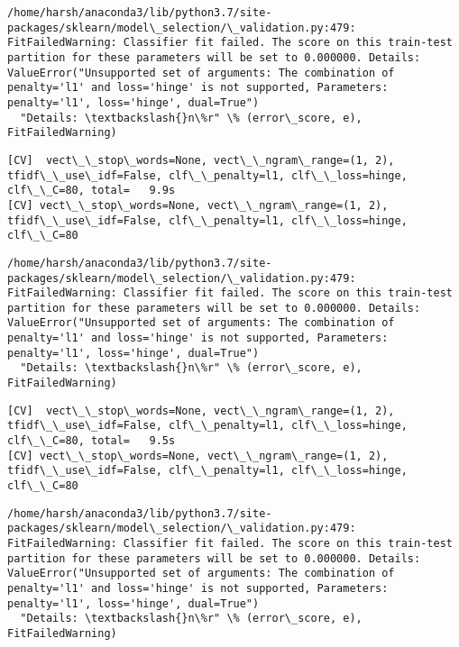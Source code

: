 \documentclass[11pt]{article}
\begin{document}
    \begin{Verbatim}[commandchars=\\\{\}]
/home/harsh/anaconda3/lib/python3.7/site-packages/sklearn/model\_selection/\_validation.py:479: FitFailedWarning: Classifier fit failed. The score on this train-test partition for these parameters will be set to 0.000000. Details: 
ValueError("Unsupported set of arguments: The combination of penalty='l1' and loss='hinge' is not supported, Parameters: penalty='l1', loss='hinge', dual=True")
  "Details: \textbackslash{}n\%r" \% (error\_score, e), FitFailedWarning)

    \end{Verbatim}

    \begin{Verbatim}[commandchars=\\\{\}]
[CV]  vect\_\_stop\_words=None, vect\_\_ngram\_range=(1, 2), tfidf\_\_use\_idf=False, clf\_\_penalty=l1, clf\_\_loss=hinge, clf\_\_C=80, total=   9.9s
[CV] vect\_\_stop\_words=None, vect\_\_ngram\_range=(1, 2), tfidf\_\_use\_idf=False, clf\_\_penalty=l1, clf\_\_loss=hinge, clf\_\_C=80 

    \end{Verbatim}

    \begin{Verbatim}[commandchars=\\\{\}]
/home/harsh/anaconda3/lib/python3.7/site-packages/sklearn/model\_selection/\_validation.py:479: FitFailedWarning: Classifier fit failed. The score on this train-test partition for these parameters will be set to 0.000000. Details: 
ValueError("Unsupported set of arguments: The combination of penalty='l1' and loss='hinge' is not supported, Parameters: penalty='l1', loss='hinge', dual=True")
  "Details: \textbackslash{}n\%r" \% (error\_score, e), FitFailedWarning)

    \end{Verbatim}

    \begin{Verbatim}[commandchars=\\\{\}]
[CV]  vect\_\_stop\_words=None, vect\_\_ngram\_range=(1, 2), tfidf\_\_use\_idf=False, clf\_\_penalty=l1, clf\_\_loss=hinge, clf\_\_C=80, total=   9.5s
[CV] vect\_\_stop\_words=None, vect\_\_ngram\_range=(1, 2), tfidf\_\_use\_idf=False, clf\_\_penalty=l1, clf\_\_loss=hinge, clf\_\_C=80 

    \end{Verbatim}

    \begin{Verbatim}[commandchars=\\\{\}]
/home/harsh/anaconda3/lib/python3.7/site-packages/sklearn/model\_selection/\_validation.py:479: FitFailedWarning: Classifier fit failed. The score on this train-test partition for these parameters will be set to 0.000000. Details: 
ValueError("Unsupported set of arguments: The combination of penalty='l1' and loss='hinge' is not supported, Parameters: penalty='l1', loss='hinge', dual=True")
  "Details: \textbackslash{}n\%r" \% (error\_score, e), FitFailedWarning)

    \end{Verbatim}
\end{document}
